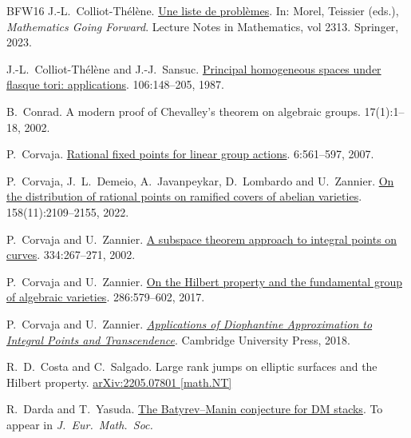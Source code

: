 \documentclass[10pt,a4paper]{amsart}
\theoremstyle{plain}
\theoremstyle{remark}
\numberwithin{theorem}{section}
\begin{document}
\begin{thebibliography}{BFW16}
J.-L.~Colliot-Th\'el\`ene.
\newblock \href{https://doi.org/10.1007/978-3-031-12244-6_2}{Une liste de probl\`emes}.
\newblock  In: Morel, Teissier (eds.), {\em Mathematics Going Forward}. Lecture Notes in Mathematics, vol 2313. Springer, 2023. 

J.-L.~Colliot-Th\'el\`ene and J.-J.~Sansuc.
\newblock \href{https://doi.org/10.1016/0021-8693(87)90026-3}{Principal homogeneous spaces under flasque tori: applications}.
 106:148--205, 1987.

B.~Conrad.
\newblock A modern proof of Chevalley’s theorem on algebraic groups. 
 17(1):1--18, 2002.

P.~Corvaja.
\newblock \href{https://doi.org/10.2422/2036-2145.2007.4.04}{Rational fixed points for linear group actions}.
 6:561--597, 2007.

P.~Corvaja, J.~L.~Demeio, A.~Javanpeykar, D.~Lombardo and U.~Zannier.
\newblock \href{https://doi.org/10.1112/S0010437X22007746}{On the distribution of rational points on ramified covers of abelian varieties}.
 158(11):2109--2155, 2022.

P.~Corvaja and U.~Zannier.
\newblock \href{https://doi.org/10.1016/S1631-073X(02)02240-9}{A subspace theorem approach to integral points on curves}.
 334:267--271, 2002.

P.~Corvaja and U.~Zannier.
\newblock \href{https://doi.org/10.1007/s00209-016-1775-x}{On the Hilbert property and the fundamental group of algebraic varieties}.
 286:579--602, 2017.

P.~Corvaja and U.~Zannier.
\newblock \href{https://doi.org/10.1017/9781108348096}{\em Applications of Diophantine Approximation to Integral Points and Transcendence}.
\newblock Cambridge University Press, 2018.

R.~D.~Costa and C.~Salgado.
\newblock Large rank jumps on elliptic surfaces and the Hilbert property.
\newblock \href{https://doi.org/10.48550/arXiv.2205.07801}{arXiv:2205.07801 [math.NT]}

R.~Darda and T.~Yasuda.
\newblock \href{https://doi.org/10.4171/jems/1510}{The Batyrev–Manin conjecture for DM stacks}. 
\newblock To appear in {\em J.\ Eur.\ Math.\ Soc.}


\end{thebibliography}
\end{document}
